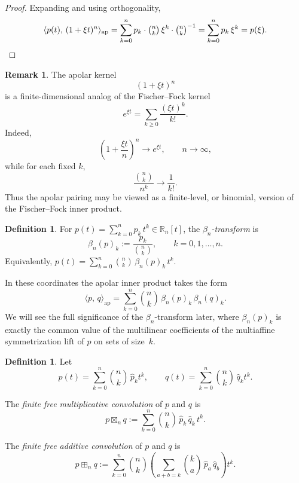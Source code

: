 \documentclass[11pt]{amsart}
\theoremstyle{definition}
\newtheorem{defn}[thm]{Definition}
\newtheorem{remark}[thm]{Remark}
\newcommand{\R}{\mathbb{R}}
\newcommand{\ip}[2]{\langle #1,\, #2 \rangle}
\newcommand{\bn}[2]{{\textstyle\binom{#1}{#2}}}
\begin{document}
\begin{proof}
Expanding and using orthogonality,
\[
  \ip{p(t)}{(1+\xi t)^n}_{\mathrm{ap}}
  = \sum_{k=0}^n p_k \cdot \bn{n}{k}\,\xi^k
  \cdot \bn{n}{k}^{-1}
  = \sum_{k=0}^n p_k\,\xi^k
  = p(\xi). \qedhere
\]
\end{proof}

\begin{remark}
The apolar kernel
\[
  (1+\xi t)^n
\]
is a finite-dimensional analog of the Fischer--Fock kernel
\[
  e^{\xi t}
  =
  \sum_{k\ge 0}\frac{(\xi t)^k}{k!}.
\]
Indeed,
\[
  \left(1+\frac{\xi t}{n}\right)^n
  \longrightarrow
  e^{\xi t},
  \qquad n\to\infty,
\]
while for each fixed \(k\),
\[
  \frac{\binom{n}{k}}{n^k}
  \longrightarrow
  \frac{1}{k!}.
\]
Thus the apolar pairing may be viewed as a finite-level, or binomial, version of the Fischer--Fock inner product.
\end{remark}



\begin{defn}\label{def:beta}
For $p(t) = \sum_{k=0}^n p_k\, t^k \in \R_n[t]$, the
\emph{$\beta_n$-transform} is
\[
  \beta_n(p)_k := \frac{p_k}{\binom{n}{k}},
  \qquad k=0,1,\dots,n.
\]
Equivalently, $p(t) = \sum_{k=0}^n \bn{n}{k}\, \beta_n(p)_k\,t^k$.
\end{defn}

In these coordinates the apolar inner product takes the form
\[
  \ip{p}{q}_{\mathrm{ap}}
  = \sum_{k=0}^n \bn{n}{k}\,\beta_n(p)_k\,\beta_n(q)_k.
\]
We will see the full significance of the $\beta_n$-transform later, where $\beta_n(p)_k$ is exactly the common value of the multilinear coefficients of the multiaffine symmetrization lift of $p$ on sets of size~$k$.

\begin{defn}
Let
\[
  p(t)=\sum_{k=0}^n \bn{n}{k}\, \hat p_k t^k,
  \qquad
  q(t)=\sum_{k=0}^n \bn{n}{k}\, \hat q_k t^k.
\]

The \emph{finite free multiplicative convolution} of $p$ and $q$
is
\[
  p\boxtimes_n q
  :=
  \sum_{k=0}^n
  \bn{n}{k}\, \hat p_k\, \hat q_k\, t^k.
\]

The \emph{finite free additive convolution} of $p$ and $q$
is
\[
  p\boxplus_n q
  :=
  \sum_{k=0}^n
  \bn{n}{k}
  \left(
    \sum_{a+b=k}
    \bn{k}{a}\,
    \hat p_a\, \hat q_b
  \right)t^k.
\]
\end{defn}
\end{document}
